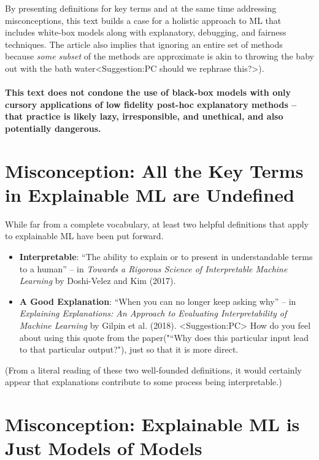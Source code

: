 \documentclass{article}
\begin{document}
By presenting definitions for key terms and at the same time addressing misconceptions, this text builds a case for a holistic approach to ML that includes white-box models \cite{yang2016scalable} \cite{} along with explanatory, debugging, and fairness techniques. The article also implies that ignoring an entire set of methods because \textit{some subset} of the methods are approximate is akin to throwing the baby out with the bath water<Suggestion:PC should we rephrase this?>). 

\paragraph{This text does not condone the use of black-box models with only cursory applications of low fidelity post-hoc explanatory methods -- that practice is likely lazy, irresponsible, and unethical, and also potentially dangerous.}

\section{Misconception: All the Key Terms in Explainable ML are Undefined}

While far from a complete vocabulary, at least two helpful definitions that apply to explainable ML have been put forward.

\begin{itemize}
\item \textbf{Interpretable}: ``The ability to explain or to present in understandable terms to a human'' -- in \textit{Towards a Rigorous Science of Interpretable Machine Learning} by Doshi-Velez and Kim (2017).
\item \textbf{A Good Explanation}: ``When you can no longer keep asking why'' -- in \textit{Explaining Explanations: An Approach to Evaluating Interpretability of Machine Learning} by Gilpin et al. (2018).
<Suggestion:PC> How do you feel about using this quote from the paper("“Why does this particular input lead to that particular output?"), just so that it is more direct.
\end{itemize}

(From a literal reading of these two well-founded definitions, it would certainly appear that explanations contribute to some process being interpretable.)  

\section{Misconception: Explainable ML is Just Models of Models}
\end{document}
